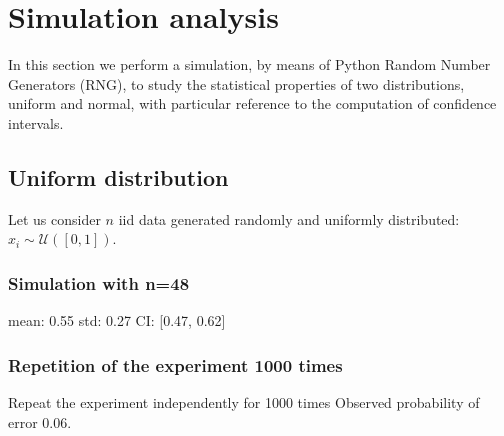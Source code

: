 \documentclass[twoside,onecolumn]{article}
\theoremstyle{definition}
\begin{document}
\section{Simulation analysis}
In this section we perform a simulation, by means of Python Random Number Generators (RNG), to study the statistical properties of two distributions, uniform and normal, with particular reference to the computation of confidence intervals.

\subsection{Uniform distribution}
Let us consider $n$ iid data generated randomly and uniformly distributed: $x_i\sim \mathcal U ([0,1])$.

\subsubsection{Simulation with n=48}
mean: 0.55
std: 0.27
CI: [0.47, 0.62]

\subsubsection{Repetition of the experiment 1000 times}
Repeat the experiment independently for 1000 times
Observed probability of error 0.06.
\end{document}
